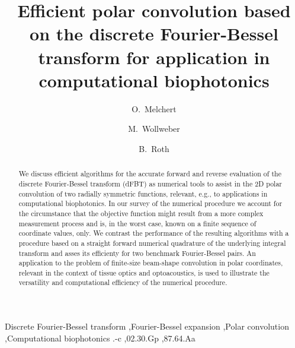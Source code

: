 \documentclass[review]{elsarticle}
\begin{document}
\begin{frontmatter}
\title{Efficient polar convolution based on the discrete 
Fourier-Bessel transform for application in 
computational biophotonics}

\author{O.\ Melchert} 
\author{M.\ Wollweber}
\author{B.\ Roth}

\address{Hanover Centre for Optical Technologies (HOT), 
Leibniz Universit\"at Hannover, 
Nienburger Str.\,17, 
D-30167 Hannover, Germany}


\begin{abstract}
We discuss efficient algorithms for the accurate forward and reverse evaluation
of the discrete Fourier-Bessel transform (dFBT) as numerical tools to assist in
the $2$D polar convolution of two radially symmetric functions, relevant, e.g.,
to applications in computational biophotonics.
  In our survey of the numerical procedure we account for the circumstance
that the objective function might result from a more complex measurement
process and is, in the worst case, known on a finite sequence of 
coordinate values, only.
  We contrast the performance of the resulting algorithms with a procedure
based on a straight forward numerical quadrature of the underlying integral
transform and asses its efficienty for two benchmark Fourier-Bessel pairs. 
  An application to the problem of finite-size beam-shape convolution in polar
coordinates, relevant in the context of tissue optics and optoacoustics, is
used to illustrate the versatility and computational efficiency of the
numerical procedure.
\end{abstract}

\begin{keyword}
Discrete Fourier-Bessel transform \sep Fourier-Bessel expansion \sep Polar convolution \sep Computational biophotonics
.-c \sep 02.30.Gp \sep 87.64.Aa
\end{keyword}

\end{frontmatter}

\end{document}

